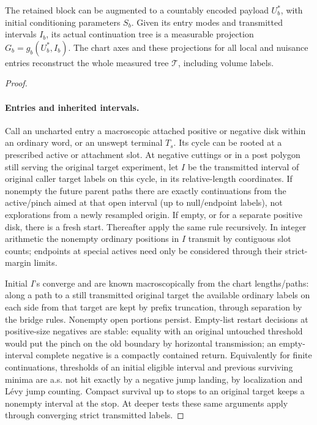 \begin{lemma}\label{kern:whole-tree}
The retained block can be augmented to a countably encoded payload \(U_b^*\), with initial
conditioning parameters \(S_b\). Given its entry modes and transmitted intervals \(I_b\), its
actual continuation tree is a measurable projection \(G_b=g_b(U_b^*,I_b)\). The chart axes and
these projections for all local and nuisance entries reconstruct the whole measured tree
\(\mathcal T\), including volume labels.
\end{lemma}
\begin{proof}\leavevmode

\paragraph{Entries and inherited intervals.}

Call an uncharted entry a macroscopic attached positive or negative disk within an ordinary word, or an
unswept terminal \(T_s\). Its cycle can be rooted at a prescribed active or attachment slot. At negative
cuttings or in a post polygon still serving the original target experiment, let \(I\) be the transmitted
interval of original caller target labels on this cycle, in its relative-length coordinates. If nonempty the
future parent paths there are exactly continuations from the active/pinch aimed at that open interval (up to
null/endpoint labels), not explorations from a newly resampled origin. If empty, or for a separate positive
disk, there is a fresh start. Thereafter apply the same rule recursively. In integer arithmetic the nonempty
ordinary positions in \(I\) transmit by contiguous slot counts; endpoints at special actives need only be
considered through their strict-margin limits.

Initial \(I\)'s converge and are known macroscopically from
the chart lengths/paths: along a path to a still transmitted original target the available ordinary labels
on each side from that target are kept by prefix truncation, through separation by the bridge rules.
Nonempty open portions persist. Empty-list restart decisions at positive-size negatives are stable: equality
with an original untouched threshold would put the pinch on the old boundary by horizontal transmission; an
empty-interval complete negative is a compactly contained return. Equivalently for finite continuations,
thresholds of an initial eligible interval and previous surviving minima are a.s. not hit exactly by a
negative jump landing, by localization and Lévy jump counting. Compact survival up to stops to an original
target keeps a nonempty interval at the stop. At deeper tests these same arguments apply through converging
strict transmitted labels.


\end{proof}
